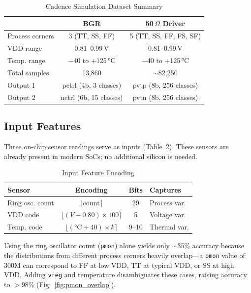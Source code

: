 \documentclass[lettersize,journal]{IEEEtran}
\begin{document}
\begin{table}[!t]
\caption{Cadence Simulation Dataset Summary\label{tab:dataset}}
\centering
\begin{tabular}{lcc}
\toprule
& \textbf{BGR} & \textbf{50\,$\Omega$ Driver} \\
\midrule
Process corners & 3 (TT, SS, FF) & 5 (TT, SS, FF, FS, SF) \\
VDD range & 0.81--0.99\,V & 0.81--0.99\,V \\
Temp. range & $-$40 to +125\,°C & $-$40 to +125\,°C \\
Total samples & 13,860 & $\sim$82,250 \\
Output 1 & pctrl (4b, 3 classes) & pvtp (8b, 256 classes) \\
Output 2 & nctrl (6b, 15 classes) & pvtn (8b, 256 classes) \\
\bottomrule
\end{tabular}
\end{table}

\subsection{Input Features}

Three on-chip sensor readings serve as inputs (Table~\ref{tab:inputs}). These sensors are already present in modern SoCs; no additional silicon is needed.

\begin{table}[!t]
\caption{Input Feature Encoding\label{tab:inputs}}
\centering
\begin{tabular}{lccl}
\toprule
\textbf{Sensor} & \textbf{Encoding} & \textbf{Bits} & \textbf{Captures} \\
\midrule
Ring osc. count & $\lfloor\text{count}\rceil$ & 29 & Process var. \\
VDD code & $\lfloor(V{-}0.80){\times}100\rceil$ & 5 & Voltage var. \\
Temp. code & $\lfloor(°\text{C}{+}40){\times}k\rceil$ & 9--10 & Thermal var. \\
\bottomrule
\end{tabular}
\end{table}

Using the ring oscillator count (\texttt{pmon}) alone yields only $\sim$35\% accuracy because the distributions from different process corners heavily overlap---a \texttt{pmon} value of 300M can correspond to FF at low VDD, TT at typical VDD, or SS at high VDD. Adding \texttt{vreg} and temperature disambiguates these cases, raising accuracy to $>$98\% (Fig.~\ref{fig:pmon_overlap}).
\end{document}
